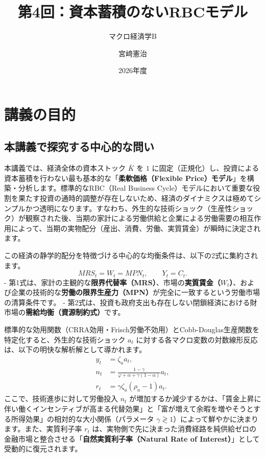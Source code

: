 \documentclass[
  japanese,
  lualatex,
  ja=standard,
  12pt,
  a4paper]{ltjsarticle}
\title{第4回：資本蓄積のないRBCモデル}
\subtitle{マクロ経済学B}
\author{宮﨑憲治}
\date{2026年度}
\renewcommand*\contentsname{目次}
\newcommand\contentsname{目次}
\begin{document}
\maketitle

\renewcommand*\contentsname{目次}
{
\setcounter{tocdepth}{3}
\tableofcontents
}

\section{講義の目的}\label{ux8b1bux7fa9ux306eux76eeux7684}

\subsection{本講義で探究する中心的な問い}\label{ux672cux8b1bux7fa9ux3067ux63a2ux7a76ux3059ux308bux4e2dux5fc3ux7684ux306aux554fux3044}

本講義では、経済全体の資本ストック \(\bar{K}\) を \(1\)
に固定（正規化）し、投資による資本蓄積を行わない最も基本的な「\textbf{柔軟価格（Flexible
Price）モデル}」を構築・分析します。標準的なRBC（Real Business
Cycle）モデルにおいて重要な役割を果たす投資の通時的調整が存在しないため、経済のダイナミクスは極めてシンプルかつ透明になります。すなわち、外生的な技術ショック（生産性ショック）が観察された後、当期の家計による労働供給と企業による労働需要の相互作用によって、当期の実物配分（産出、消費、労働、実質賃金）が瞬時に決定されます。

この経済の静学的配分を特徴づける中心的な均衡条件は、以下の2式に集約されます。
\[
MRS_t = W_t = MPN_t, \qquad Y_t = C_t.
\] -
第1式は、家計の主観的な\textbf{限界代替率（MRS）}、市場の\textbf{実質賃金（\(W_t\)）}、および企業の技術的な\textbf{労働の限界生産力（MPN）}が完全に一致するという労働市場の清算条件です。
-
第2式は、投資も政府支出も存在しない閉鎖経済における財市場の\textbf{需給均衡（資源制約式）}です。

標準的な効用関数（CRRA効用・Frisch労働不効用）とCobb-Douglas生産関数を特定化すると、外生的な技術ショック
\(a_t\)
に対する各マクロ変数の対数線形反応は、以下の明快な解析解として導かれます。
\[
\begin{aligned}
y_t &= \zeta_a a_t,\\
n_t &= \frac{1-\gamma}{\varphi+\alpha+\gamma(1-\alpha)} a_t,\\
r_t &= \gamma \zeta_a (\rho_a - 1) a_t.
\end{aligned}
\] ここで、技術進歩に対して労働投入 \(n_t\)
が増加するか減少するかは、「賃金上昇に伴い働くインセンティブが高まる代替効果」と「富が増えて余暇を増やそうとする所得効果」の相対的な大小関係（パラメータ
\(\gamma \gtrless 1\)）によって鮮やかに決まります。また、実質利子率
\(r_t\)
は、実物側で先に決まった消費経路を純供給ゼロの金融市場と整合させる「\textbf{自然実質利子率（Natural
Rate of Interest）}」として受動的に復元されます。
\end{document}
